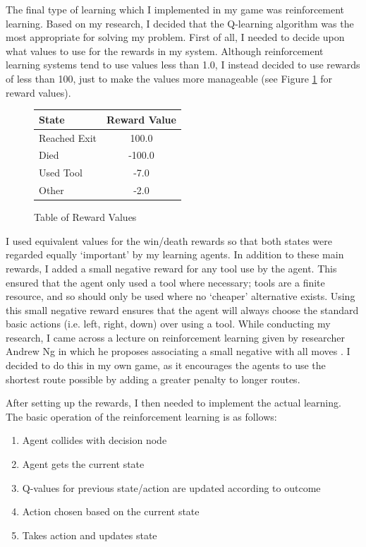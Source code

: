 \documentclass[a4paper,oneside]{report}
\begin{document}
The final type of learning which I implemented in my game was reinforcement learning. Based on my research, I decided that the Q-learning algorithm was the most appropriate for solving my problem. First of all, I needed to decide upon what values to use for the rewards in my system. Although reinforcement learning systems tend to use values less than 1.0, I instead decided to use rewards of less than 100, just to make the values more manageable (see Figure \ref{fig:Rewards} for reward values).

\begin{figure}
\centering
\begin{tabular}{| l | c |}
  \hline
  State  & Reward Value \\
  \hline
  Reached Exit    &  100.0 \\
  Died   		  &  -100.0 \\
  Used Tool       &  -7.0 \\
  Other  		  &  -2.0 \\
  \hline
\end{tabular}
\caption{Table of Reward Values}
\label{fig:Rewards}
\end{figure}

I used equivalent values for the win/death rewards so that both states were regarded equally `important' by my learning agents. In addition to these main rewards, I added a small negative reward for any tool use by the agent. This ensured that the agent only used a tool where necessary; tools are a finite resource, and so should only be used where no `cheaper' alternative exists. Using this small negative reward ensures that the agent will always choose the standard basic actions (i.e. left, right, down) over using a tool. While conducting my research, I came across a lecture on reinforcement learning given by researcher Andrew Ng in which he proposes associating a small negative with all moves \cite{Ng:uq}. I decided to do this in my own game, as it encourages the agents to use the shortest route possible by adding a greater penalty to longer routes.

After setting up the rewards, I then needed to implement the actual learning. The basic operation of the reinforcement learning is as follows:

\begin{enumerate}
	\item Agent collides with decision node
	\item Agent gets the current state
	\item Q-values for previous state/action are updated according to outcome
	\item Action chosen based on the current state
	\item Takes action and updates state
\end{enumerate}
\end{document}

